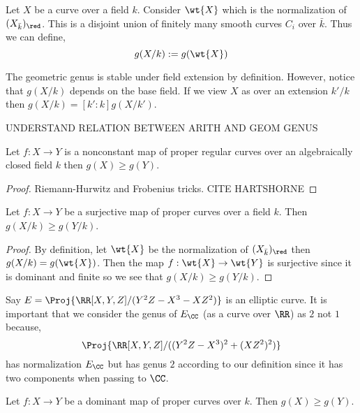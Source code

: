 \documentclass[12pt]{article}
\begin{document}
\begin{defn}
Let $X$ be a curve over a field $k$. Consider $\wt{X}$ which is the normalization of $(X_{\bar{k}})_{\red}$. This is a disjoint union of finitely many smooth curves $C_i$ over $\bar{k}$. Thus we can define,
\[ g(X/k) := g(\wt{X}) \]
\end{defn}

\begin{rmk}
The geometric genus is stable under field extension by definition. 
However, notice that $g(X/k)$ depends on the base field. If we view $X$ as over an extension $k' / k$ then $g(X/k) = [k' : k] g(X / k')$.  
\end{rmk}


UNDERSTAND RELATION BETWEEN ARITH AND GEOM GENUS

\begin{lemma}
Let $f : X \to Y$ is a nonconstant map of proper regular curves over an algebraically closed field $k$ then $g(X) \ge g(Y)$.
\end{lemma}

\begin{proof}
Riemann-Hurwitz and Frobenius tricks. CITE HARTSHORNE
\end{proof}

\begin{prop}
Let $f : X \to Y$ be a surjective map of proper curves over a field $k$. Then $g(X/k) \ge g(Y/k)$.
\end{prop}

\begin{proof}
By definition, let $\wt{X}$ be the normalization of $(X_{\bar{k}})_{\red}$ then $g(X/k) = g(\wt{X})$. Then the map $f : \wt{X} \to \wt{Y}$ is surjective since it is dominant and finite so we see that $g(X/k) \ge g(Y/k)$.
\end{proof}

\begin{example}
Say $E = \Proj{\RR[X,Y,Z]/(Y^2 Z - X^3 - X Z^2)}$ is an elliptic curve. It is important that we consider the genus of $E_{\CC}$ (as a curve over $\RR$) as $2$ not $1$ because,
\[ \Proj{\RR[X,Y,Z]/((Y^2 Z - X^3)^2 + (X Z^2)^2)} \]
has normalization $E_{\CC}$ but has genus $2$ according to our definition since it has two components when passing to $\CC$.
\end{example}

\begin{prop}
Let $f : X \to Y$ be a dominant map of proper curves over $k$. Then $g(X) \ge g(Y)$.
\end{prop}
\end{document}
